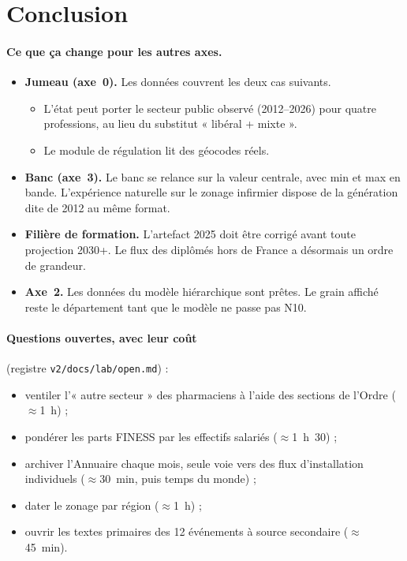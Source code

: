 \documentclass[11pt]{article}
\begin{document}
\section{Conclusion}
\paragraph{Ce que ça change pour les autres axes.}
\begin{itemize}
  \item \textbf{Jumeau (axe~0).} Les données couvrent les deux cas suivants.
  \begin{itemize}
    \item L'état peut porter le secteur public observé (2012--2026) pour quatre professions, au lieu du
    substitut « libéral + mixte ».
    \item Le module de régulation lit des géocodes réels.
  \end{itemize}
  \item \textbf{Banc (axe~3).} Le banc se relance sur la valeur centrale, avec min et max en bande. L'expérience
  naturelle sur le zonage infirmier dispose de la génération dite de 2012 au même format.
  \item \textbf{Filière de formation.} L'artefact 2025 doit être corrigé avant toute projection 2030+. Le flux
  des diplômés hors de France a désormais un ordre de grandeur.
  \item \textbf{Axe~2.} Les données du modèle hiérarchique sont prêtes. Le grain affiché reste le département tant
  que le modèle ne passe pas N10.
\end{itemize}

\paragraph{Questions ouvertes, avec leur coût} (registre \texttt{v2/docs/lab/open.md}) :
\begin{itemize}
  \item ventiler l'« autre secteur » des pharmaciens à l'aide des sections de l'Ordre (\(\approx\)1~h) ;
  \item pondérer les parts FINESS par les effectifs salariés (\(\approx\)1~h~30) ;
  \item archiver l'Annuaire chaque mois, seule voie vers des flux d'installation individuels (\(\approx\)30~min,
  puis temps du monde) ;
  \item dater le zonage par région (\(\approx\)1~h) ;
  \item ouvrir les textes primaires des 12 événements à source secondaire (\(\approx\)45~min).
\end{itemize}
\end{document}
